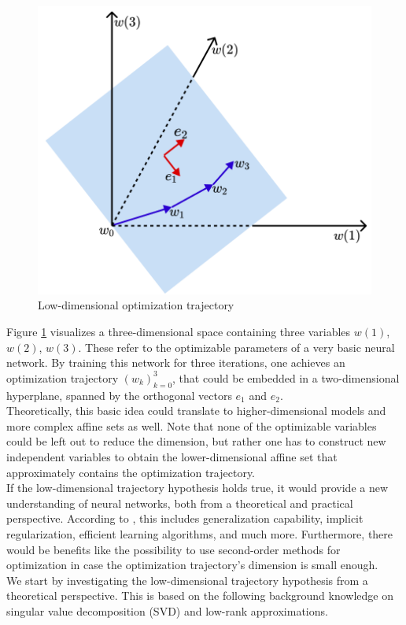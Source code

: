 \documentclass[11pt, a4paper]{article}
\begin{document}
\begin{figure}[!h]
\centering
\includegraphics[width=0.5\linewidth]{images/trajectory.png}
\caption{Low-dimensional optimization trajectory}
\label{fig:trajectory}
\end{figure}  

Figure \ref{fig:trajectory} visualizes a three-dimensional space containing three variables $w(1)$, $w(2)$, $w(3)$. These refer to the optimizable parameters of a very basic neural network. By training this network for three iterations, one achieves an optimization trajectory $(w_k)_{k=0}^3$, that could be embedded in a two-dimensional hyperplane, spanned by the orthogonal vectors $e_1$ and $e_2$. \\

Theoretically, this basic idea could translate to higher-dimensional models and more complex affine sets as well. Note that none of the optimizable variables could be left out to reduce the dimension, but rather one has to construct new independent variables to obtain the lower-dimensional affine set that approximately contains the optimization trajectory.  \\

If the low-dimensional trajectory hypothesis holds true, it would provide a new understanding of neural networks, both from a theoretical and practical perspective. According to \cite{Paper}, this includes generalization capability, implicit regularization, efficient learning algorithms, and much more. Furthermore, there would be benefits like the possibility to use second-order methods for optimization in case the optimization trajectory's dimension is small enough. \\

We start by investigating the low-dimensional trajectory hypothesis from a theoretical perspective. This is based on the following background knowledge on singular value decomposition (SVD) and low-rank approximations.
\end{document}
